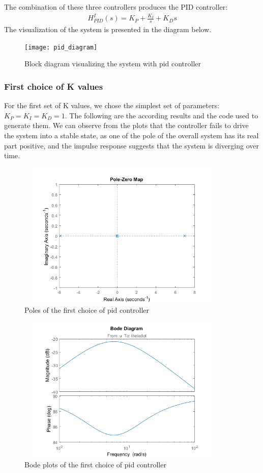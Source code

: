 \documentclass [12pt,letterpaper]{exam}
\begin{document}
The combination of these three controllers produces the PID controller:
\begin{align}
H^{I}_{PID}(s) = K_P + \frac{K_I}{s} + K_Ds
\end{align}
The visualization of the system is presented in the diagram below.
\begin{figure}[H]
  \centering
    \texttt{[image: pid\_diagram]}
  \caption{Block diagram visualizing the system with pid controller}
  \label{fig:pid_diagram}
\end{figure}

\subsubsection{First choice of K values}
For the first set of K values, we chose the simplest set of parameters: $K_P = K_I = K_D = 1$. The following are the according results and the code used to generate them. We can observe from the plots that the controller fails to drive the system into a stable state, as one of the pole of the overall system has its real part positive, and the impulse response suggests that the system is diverging over time.

\begin{figure}[H]
  \centering
    \includegraphics[width=10.15cm, height=7cm]{pid_poles} 
  \caption{Poles of the first choice of pid controller}
  \label{fig:pid_poles}
\end{figure}

\begin{figure}[H]
  \centering
    \includegraphics[width=10.15cm, height=7cm]{pid_bode} 
  \caption{Bode plots of the first choice of pid controller}
  \label{fig:pid_bode}
\end{figure}
\end{document}
